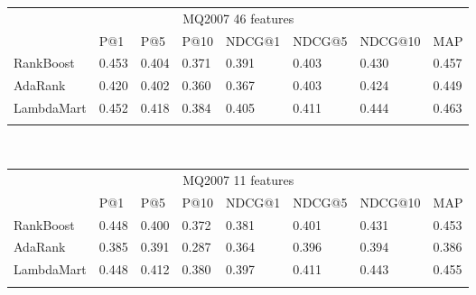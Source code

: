 \begin{table}[t]
\begin{center}
\begin{tabular}{llllllll}
\multicolumn{8}{c}{MQ2007 46 features}                                     \\
           & P@1    & P@5    & P@10   & NDCG@1 & NDCG@5 & NDCG@10 & MAP    \\ \hline
RankBoost  & 0.453 & 0.404 & 0.371 & 0.391 & 0.403 & 0.430  & 0.457 \\
AdaRank    & 0.420 & 0.402 & 0.360 & 0.367 & 0.403 & 0.424  & 0.449 \\
LambdaMart & 0.452 & 0.418 & 0.384 & 0.405 & 0.411 & 0.444  & 0.463 \\
\hline
\\
\end{tabular}
\\
\begin{tabular}{llllllll}
\multicolumn{8}{c}{MQ2007 11 features}                                 \\
           & P@1   & P@5   & P@10  & NDCG@1 & NDCG@5 & NDCG@10 & MAP   \\ \hline
RankBoost  & 0.448 & 0.400 & 0.372 & 0.381  & 0.401  & 0.431   & 0.453 \\
AdaRank    & 0.385 & 0.391 & 0.287 & 0.364  & 0.396  & 0.394   & 0.386 \\
LambdaMart & 0.448 & 0.412 & 0.380 & 0.397  & 0.411  & 0.443   & 0.455 \\
\hline
\\
\end{tabular}
\label{tab:11vs46}
\end{center}
\end{table}



